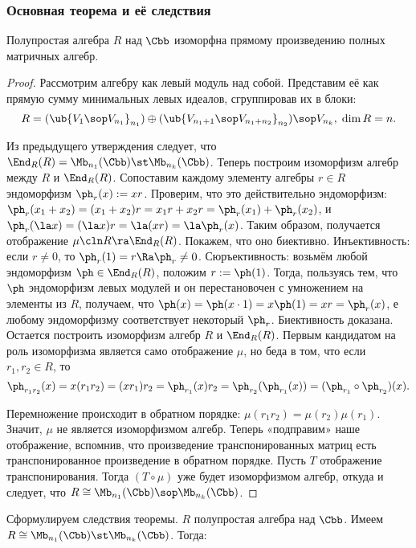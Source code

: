 \documentclass[a4paper]{article}
\begin{document}
\subsubsection{Основная теорема и её следствия}

\begin{theorem}
Полупростая алгебра $R$ над $\Cbb$ изоморфна прямому произведению полных матричных алгебр.
\end{theorem}
\begin{proof}
Рассмотрим алгебру как левый модуль над собой. Представим её как прямую сумму минимальных левых идеалов,
сгруппировав их в блоки:
$$R=(\ub{V_1 \sop V_{n_1}}_{n_1})\oplus(\ub{V_{n_1+1} \sop V_{n_1+n_2}}_{n_2}) \sop V_{n_k}, \; \dim R = n.$$

Из предыдущего утверждения следует, что $\End_R(R) = \Mb_{n_1}(\Cbb) \st \Mb_{n_k}(\Cbb)$. Теперь построим
изоморфизм алгебр между $R$ и $\End_R(R)$. Сопоставим каждому элементу алгебры $r \in R$ эндоморфизм
$\ph_r(x):=xr$. Проверим, что это действительно эндоморфизм:
$\ph_r(x_1+x_2)=(x_1+x_2)r=x_1r+x_2r=\ph_r(x_1)+\ph_r(x_2)$, и $\ph_r(\la x)=(\la x)r=\la(x
r)=\la \ph_r(x)$. Таким образом, получается отображение $\mu\cln R \ra \End_R(R)$. Покажем, что оно
биективно. Инъективность: если $r \neq 0$, то $\ph_r(1)=r \Ra \ph_r \neq 0$. Сюръективность: возьмём любой
эндоморфизм $\ph \in \End_R(R)$, положим $r:=\ph(1)$. Тогда, пользуясь тем, что $\ph$ эндоморфизм левых
модулей и он перестановочен с умножением на элементы из $R$, получаем, что $\ph(x)=\ph(x \cdot 1)=x \ph(1) =
x r = \ph_r(x)$, е любому эндоморфизму соответствует некоторый $\ph_r$. Биективность доказана. Остается
построить изоморфизм алгебр $R$ и $\End_R(R)$. Первым кандидатом на роль изоморфизма является само
отображение $\mu$, но беда в том, что если $r_1, r_2 \in R$, то
$$\ph_{r_1 r_2}(x)=x(r_1 r_2)=(x r_1)r_2 = \ph_{r_1}(x) r_2 = \ph_{r_2}(\ph_{r_1}(x))=(\ph_{r_1} \circ \ph_{r_2})(x).$$

Перемножение происходит в обратном порядке: $\mu(r_1 r_2)=\mu(r_2)\mu(r_1)$. Значит, $\mu$ не является
изоморфизмом алгебр. Теперь «подправим» наше отображение, вспомнив, что произведение транспонированных матриц
есть транспонированное произведение в обратном порядке. Пусть $T$ отображение транспонирования. Тогда $(T
\circ \mu)$ уже будет изоморфизмом алгебр, откуда и следует, что $R \cong \Mb_{n_1}(\Cbb) \sop
\Mb_{n_k}(\Cbb)$.
\end{proof}

Сформулируем следствия теоремы. $R$ полупростая алгебра над $\Cbb$. Имеем $R \cong \Mb_{n_1}(\Cbb) \st \Mb_{n_k}(\Cbb)$.
Тогда:
\end{document}
